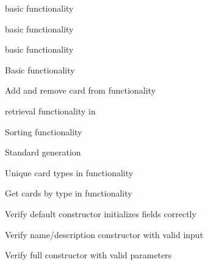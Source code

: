 \begin{DoxyRefList}
\label{test__test000019}%
%
 basic functionality  



\label{test__test000021}%
%
 basic functionality  



\label{test__test000023}%
%
 basic functionality  



\label{test__test000025}%
%
Basic  functionality  



\label{test__test000026}%
%
Add and remove card from  functionality  



\label{test__test000028}%
%
 retrieval functionality in   



\label{test__test000029}%
%
Sorting  functionality  



\label{test__test000030}%
%
Standard  generation  



\label{test__test000031}%
%
Unique card types in  functionality  



\label{test__test000032}%
%
Get cards by type in  functionality  



\label{test__test000033}%
%
Verify default constructor initializes fields correctly  



\label{test__test000034}%
%
Verify name/description constructor with valid input  



\label{test__test000037}%
%
Verify full constructor with valid parameters  




\end{DoxyRefList}
